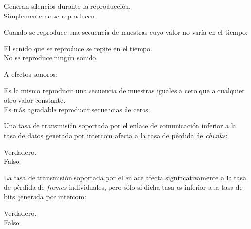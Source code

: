 \documentclass[legalpaper, 12pt, addpoints]{exam}
\begin{document}
\begin{questions}
\begin{oneparchoices}
  \choice Generan silencios durante la reproducción.\\
  \choice Simplemente no se reproducen.
\end{oneparchoices}
  
\vspace{0.10in}

\question Cuando se reproduce una secuencia de muestras cuyo valor no varía en el tiempo:

\begin{oneparchoices}
  \choice El sonido que se reproduce se repite en el tiempo.\\
  \choice No se reproduce ningún sonido.
\end{oneparchoices}
  
\vspace{0.10in}

\question A efectos sonoros:

\begin{oneparchoices}
  \choice Es lo mismo reproducir una secuencia de muestras iguales a cero que a cualquier otro valor constante.\\
  \choice Es más agradable reproducir secuencias de ceros.
\end{oneparchoices}
  
\vspace{0.10in}

\question Una tasa de transmisión soportada por el enlace de comunicación inferior a la tasa de datos generada por intercom afecta a la tasa de pérdida de \emph{chunks}:

\begin{oneparchoices}
  \choice Verdadero.\\
  \choice Falso.
\end{oneparchoices}
  
\vspace{0.10in}

\question La tasa de transmisión soportada por el enlace afecta significativamente a la tasa de pérdida de \emph{frames} individuales, pero sólo si dicha tasa es inferior a la tasa de bits generada por intercom:

\begin{oneparchoices}
  \choice Verdadero.\\
  \choice Falso.
\end{oneparchoices}
  
\vspace{0.10in}


\end{questions}
\end{document}
